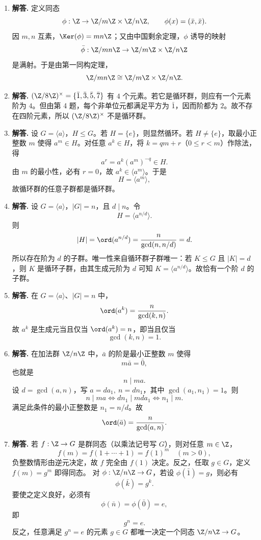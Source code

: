 \begin{enumerate}[label=\textbf{\arabic*.}, leftmargin=*, itemsep=1em]
\item \textbf{解答.} 定义同态
\[
\phi:\Z\to \Z/m\Z\times \Z/n\Z,\qquad \phi(x)=(\bar x,\bar x).
\]
因 $m,n$ 互素，$\Ker(\phi)=mn\Z$；又由中国剩余定理，$\phi$ 诱导的映射
\[
\bar\phi:\Z/mn\Z\to \Z/m\Z\times \Z/n\Z
\]
是满射。于是由第一同构定理，
\[
\Z/mn\Z\cong \Z/m\Z\times \Z/n\Z.
\]

\item \textbf{解答.} $(\Z/8\Z)^\times=\{\bar1,\bar3,\bar5,\bar7\}$ 有 $4$ 个元素。若它是循环群，则应有一个元素阶为 $4$。但由第 4 题，每个非单位元都满足平方为 $\bar1$，因而阶都为 $2$。故不存在四阶元素，所以 $(\Z/8\Z)^\times$ 不是循环群。

\item \textbf{解答.} 设 $G=\langle a\rangle$，$H\le G$。若 $H=\{e\}$，则显然循环。若 $H\neq\{e\}$，取最小正整数 $m$ 使得 $a^m\in H$。对任意 $a^k\in H$，将 $k=qm+r$（$0\le r<m$）作除法，得
\[
a^r=a^k(a^m)^{-q}\in H.
\]
由 $m$ 的最小性，必有 $r=0$，故 $a^k\in \langle a^m\rangle$。于是
\[
H=\langle a^m\rangle,
\]
故循环群的任意子群都是循环群。

\item \textbf{解答.} 设 $G=\langle a\rangle$，$|G|=n$，且 $d\mid n$。令
\[
H=\langle a^{n/d}\rangle.
\]
则
\[
|H|=\ord(a^{n/d})=\frac{n}{\gcd(n,n/d)}=d.
\]
所以存在阶为 $d$ 的子群。唯一性来自循环群子群唯一：若 $K\le G$ 且 $|K|=d$，则 $K$ 是循环子群，由其生成元阶为 $d$ 可知 $K=\langle a^{n/d}\rangle$。故恰有一个阶 $d$ 的子群。

\item \textbf{解答.} 在 $G=\langle a\rangle$、$|G|=n$ 中，
\[
\ord(a^k)=\frac{n}{\gcd(k,n)}.
\]
故 $a^k$ 是生成元当且仅当 $\ord(a^k)=n$，即当且仅当
\[
\gcd(k,n)=1.
\]

\item \textbf{解答.} 在加法群 $\Z/n\Z$ 中，$\bar a$ 的阶是最小正整数 $m$ 使得
\[
m\bar a=\bar0,
\]
也就是
\[
n\mid ma.
\]
设 $d=\gcd(a,n)$，写 $a=da_1,\ n=dn_1$，其中 $\gcd(a_1,n_1)=1$。则
\[
n\mid ma \iff dn_1\mid mda_1 \iff n_1\mid m.
\]
满足此条件的最小正整数是 $n_1=n/d$。故
\[
\ord(\bar a)=\frac{n}{\gcd(a,n)}.
\]

\item \textbf{解答.} 若 $f:\Z\to G$ 是群同态（以乘法记号写 $G$），则对任意 $m\in\Z$，
\[
f(m)=f(1+\cdots+1)=f(1)^m \quad (m>0),
\]
负整数情形由逆元决定，故 $f$ 完全由 $f(1)$ 决定。反之，任取 $g\in G$，定义 $f(m)=g^m$ 即得同态。  
对 $\phi:\Z/n\Z\to G$，若设 $\phi(\bar1)=g$，则必有
\[
\phi(\bar k)=g^k.
\]
要使之定义良好，必须有
\[
\phi(\bar n)=\phi(\bar0)=e,
\]
即
\[
g^n=e.
\]
反之，任意满足 $g^n=e$ 的元素 $g\in G$ 都唯一决定一个同态 $\Z/n\Z\to G$。


\end{enumerate}
